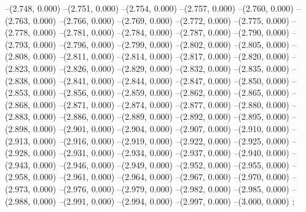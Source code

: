{--(2.748, 0.000)
--(2.751, 0.000)
--(2.754, 0.000)
--(2.757, 0.000)
--(2.760, 0.000)
--(2.763, 0.000)
--(2.766, 0.000)
--(2.769, 0.000)
--(2.772, 0.000)
--(2.775, 0.000)
--(2.778, 0.000)
--(2.781, 0.000)
--(2.784, 0.000)
--(2.787, 0.000)
--(2.790, 0.000)
--(2.793, 0.000)
--(2.796, 0.000)
--(2.799, 0.000)
--(2.802, 0.000)
--(2.805, 0.000)
--(2.808, 0.000)
--(2.811, 0.000)
--(2.814, 0.000)
--(2.817, 0.000)
--(2.820, 0.000)
--(2.823, 0.000)
--(2.826, 0.000)
--(2.829, 0.000)
--(2.832, 0.000)
--(2.835, 0.000)
--(2.838, 0.000)
--(2.841, 0.000)
--(2.844, 0.000)
--(2.847, 0.000)
--(2.850, 0.000)
--(2.853, 0.000)
--(2.856, 0.000)
--(2.859, 0.000)
--(2.862, 0.000)
--(2.865, 0.000)
--(2.868, 0.000)
--(2.871, 0.000)
--(2.874, 0.000)
--(2.877, 0.000)
--(2.880, 0.000)
--(2.883, 0.000)
--(2.886, 0.000)
--(2.889, 0.000)
--(2.892, 0.000)
--(2.895, 0.000)
--(2.898, 0.000)
--(2.901, 0.000)
--(2.904, 0.000)
--(2.907, 0.000)
--(2.910, 0.000)
--(2.913, 0.000)
--(2.916, 0.000)
--(2.919, 0.000)
--(2.922, 0.000)
--(2.925, 0.000)
--(2.928, 0.000)
--(2.931, 0.000)
--(2.934, 0.000)
--(2.937, 0.000)
--(2.940, 0.000)
--(2.943, 0.000)
--(2.946, 0.000)
--(2.949, 0.000)
--(2.952, 0.000)
--(2.955, 0.000)
--(2.958, 0.000)
--(2.961, 0.000)
--(2.964, 0.000)
--(2.967, 0.000)
--(2.970, 0.000)
--(2.973, 0.000)
--(2.976, 0.000)
--(2.979, 0.000)
--(2.982, 0.000)
--(2.985, 0.000)
--(2.988, 0.000)
--(2.991, 0.000)
--(2.994, 0.000)
--(2.997, 0.000)
--(3.000, 0.000)
;
}
